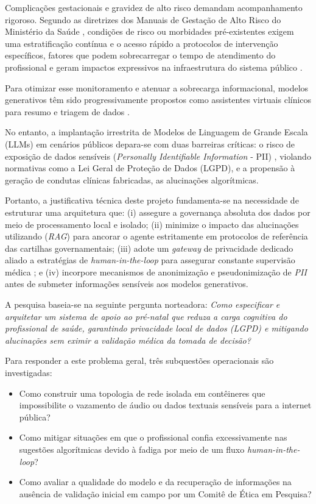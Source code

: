\documentclass[12pt]{article}
\begin{document}
Complicações gestacionais e gravidez de alto risco demandam acompanhamento rigoroso.
Segundo as diretrizes dos Manuais de Gestação de Alto Risco do Ministério da Saúde \cite{ManualAltoRisco2022, ManualAltoRisco2012}, condições de risco ou morbidades pré-existentes exigem uma estratificação contínua e o acesso rápido a protocolos de intervenção específicos, fatores que podem sobrecarregar o tempo de atendimento do profissional e geram impactos expressivos na infraestrutura do sistema público \cite{MaternalMorbidity2025}.

Para otimizar esse monitoramento e atenuar a sobrecarga informacional, modelos generativos têm sido progressivamente propostos como assistentes virtuais clínicos para resumo e triagem de dados \cite{Clusmann2023, Rajpurkar2022}.

No entanto, a implantação irrestrita de Modelos de Linguagem de Grande Escala (LLMs) em cenários públicos depara-se com duas barreiras críticas: o risco de exposição de dados sensíveis (\textit{Personally Identifiable Information} - PII) \cite{OWASPLLM2023, Atheniense2024}, violando normativas como a Lei Geral de Proteção de Dados (LGPD), e a propensão à geração de condutas clínicas fabricadas, as alucinações algorítmicas.

Portanto, a justificativa técnica deste projeto fundamenta-se na necessidade de estruturar uma arquitetura que:
(i) assegure a governança absoluta dos dados por meio de processamento local e isolado;
(ii) minimize o impacto das alucinações utilizando (\textit{RAG}) para ancorar o agente estritamente em protocolos de referência das cartilhas governamentais;
(iii) adote um \textit{gateway} de privacidade dedicado aliado a estratégias de \textit{human-in-the-loop} para assegurar constante supervisão médica \cite{FrameworkGovBR2025};
e (iv) incorpore mecanismos de anonimização e pseudonimização de \textit{PII} antes de submeter informações sensíveis aos modelos generativos.


A pesquisa baseia-se na seguinte pergunta norteadora: \textit{Como especificar e arquitetar um sistema de apoio ao pré-natal que reduza a carga cognitiva do profissional de saúde, garantindo privacidade local de dados (LGPD) e mitigando alucinações sem eximir a validação médica da tomada de decisão?}

Para responder a este problema geral, três subquestões operacionais são investigadas:
\begin{itemize}
  \item Como construir uma topologia de rede isolada em contêineres que impossibilite o vazamento de áudio ou dados textuais sensíveis para a internet pública?
  \item Como mitigar situações em que o profissional confia excessivamente nas sugestões algorítmicas devido à fadiga por meio de um fluxo \textit{human-in-the-loop}?
  \item Como avaliar a qualidade do modelo e da recuperação de informações na ausência de validação inicial em campo por um Comitê de Ética em Pesquisa?
\end{itemize}
\end{document}
